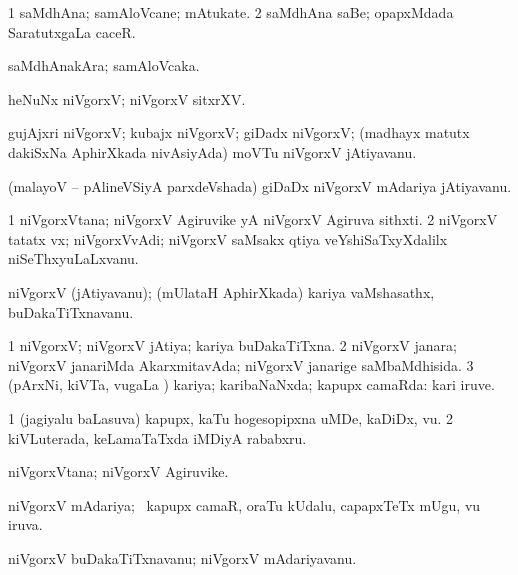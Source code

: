 \bentry
{}
\gl{\nA}
\bmng
\bnum
\num{1} saMdhAna; samAloVcane; mAtukate. 
\num{2} saMdhAna saBe; opapxMdada SaratutxgaLa caceR. 
\enum
\emng
\eentry

\bentry
{}
\gl{\nA}
\bmng
saMdhAnakAra; samAloVcaka. 
\emng
\eentry

\bentry
{}
\gl{\nA}
\bmng
heNuNx niVgorxV; niVgorxV sitxrXV. 
\emng
\eentry

\bentry
{}
\gl{\nA}
\bmng
gujAjxri niVgorxV; kubajx niVgorxV; giDadx niVgorxV; (madhayx matutx dakiSxNa AphirXkada nivAsiyAda) moVTu niVgorxV jAtiyavanu. 
\emng
\eentry

\bentry
{}
\gl{\nA}
\bmng
(malayoV -- pAlineVSiyA parxdeVshada) giDaDx niVgorxV mAdariya jAtiyavanu. 
\emng
\eentry

\bentry
{}
\gl{\nA}
\bmng
\bnum
\num{1} niVgorxVtana; niVgorxV Agiruvike yA niVgorxV Agiruva sithxti. 
\num{2} niVgorxV tatatx vx; niVgorxVvAdi; niVgorxV saMsakx qtiya veYshiSaTxyXdalilx niSeThxyuLaLxvanu. 
\enum
\emng
\eentry

\bentry
{}
\pron{}
\gl{\nA}
\bmng
niVgorxV (jAtiyavanu); (mUlataH AphirXkada) kariya vaMshasathx, buDakaTiTxnavanu. 
\emng
\eentry

\bentry
{}
\gl{\gu}
\bmng
\bnum
\num{1} niVgorxV; niVgorxV jAtiya; kariya buDakaTiTxna. 
\num{2} niVgorxV janara; niVgorxV janariMda AkarxmitavAda; niVgorxV janarige saMbaMdhisida. 
\num{3} (pArxNi, kiVTa, \mo vugaLa \vi) kariya; karibaNaNxda; kapupx camaRda:  kari iruve. 
\enum
\emng
\eentry

\bentry
{}
\gl{\nA}
\bmng
\bnum
\num{1} (jagiyalu baLasuva) kapupx, kaTu hogesopipxna uMDe, kaDiDx, \mo vu. 
\num{2} kiVLuterada, keLamaTaTxda iMDiyA rababxru. 
\enum
\emng
\eentry

\bentry
{}
\gl{\nA}
\bmng
niVgorxVtana; niVgorxV Agiruvike. 
\emng
\eentry

\bentry
{}
\gl{\gu}
\bmng
niVgorxV mAdariya; \kanmu\ kapupx camaR, oraTu kUdalu, capapxTeTx mUgu, \mo vu iruva. 
\emng
\eentry

\bentry
{}
\gl{\nA}
\bmng
niVgorxV buDakaTiTxnavanu; niVgorxV mAdariyavanu. 
\emng
\eentry

